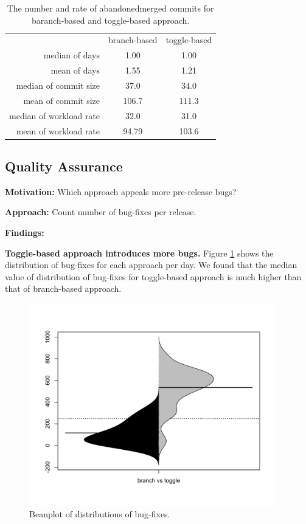\begin{table}
	\caption{The number and rate of abandoned\/merged commits for baranch-based and toggle-based approach.}
	\label{tab:workdays}
	\begin{tabular}{r|c|c}
			& branch-based & toggle-based\\
		median of days & 1.00 & 1.00 \\
		mean of days  & 1.55 & 1.21 \\
		median of commit size & 37.0 & 34.0 \\
		mean of commit size & 106.7 & 111.3 \\
		median of workload rate & 32.0 & 31.0 \\
		mean of workload rate & 94.79 & 103.6 \\
	\end{tabular}
\end{table}





\subsection{Quality Assurance}

\textbf{Motivation:}
Which approach appeals more pre-release bugs?

\textbf{Approach:}
Count number of bug-fixes per release.

\textbf{Findings:} 

\textbf{Toggle-based approach introduces more bugs.} Figure \ref{fig:bug} shows the distribution of bug-fixes for each approach per day. We found that the median value of distribution of bug-fixes for toggle-based approach is much higher than that of branch-based approach.

\begin{figure}
\includegraphics[width=0.95\textwidth]{figure/beforeAfterBug.pdf}
\caption{Beanplot of distributions of bug-fixes.}
\label{fig:bug}
\end{figure}



